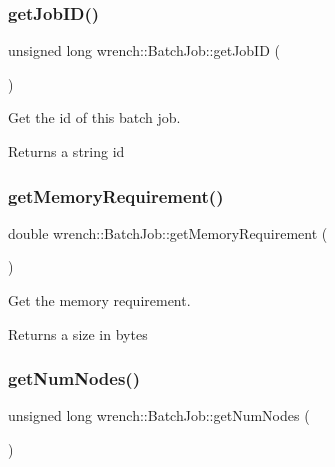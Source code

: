 \subsubsection{\texorpdfstring{get\+Job\+I\+D()}{getJobID()}}
{\footnotesize\ttfamily unsigned long wrench\+::\+Batch\+Job\+::get\+Job\+ID (\begin{DoxyParamCaption}{ }\end{DoxyParamCaption})}



Get the id of this batch job. 

\begin{DoxyReturn}{Returns}
a string id 
\end{DoxyReturn}
\mbox{\label{classwrench_1_1_batch_job_abb349b19cdc9975d98227dffbe146bfc}} 
\subsubsection{\texorpdfstring{get\+Memory\+Requirement()}{getMemoryRequirement()}}
{\footnotesize\ttfamily double wrench\+::\+Batch\+Job\+::get\+Memory\+Requirement (\begin{DoxyParamCaption}{ }\end{DoxyParamCaption})}



Get the memory requirement. 

\begin{DoxyReturn}{Returns}
a size in bytes 
\end{DoxyReturn}
\mbox{\label{classwrench_1_1_batch_job_abf624dffc6a004f015bd5b6fbdf17c94}} 
\subsubsection{\texorpdfstring{get\+Num\+Nodes()}{getNumNodes()}}
{\footnotesize\ttfamily unsigned long wrench\+::\+Batch\+Job\+::get\+Num\+Nodes (\begin{DoxyParamCaption}{ }\end{DoxyParamCaption})}



